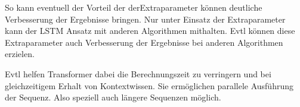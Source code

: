 So kann eventuell der Vorteil der derExtraparameter können deutliche Verbesserung der Ergebnisse bringen.
Nur unter Einsatz der Extraparameter kann der \ac{LSTM} Ansatz mit anderen Algorithmen mithalten.
Evtl können diese Extraparameter auch Verbesserung der Ergebnisse bei anderen Algorithmen erzielen.

Evtl helfen Transformer dabei die Berechnungszeit zu verringern und bei gleichzeitigem Erhalt von Kontextwissen.
Sie ermöglichen parallele Ausführung der Sequenz.
Also speziell auch längere Sequenzen möglich.

